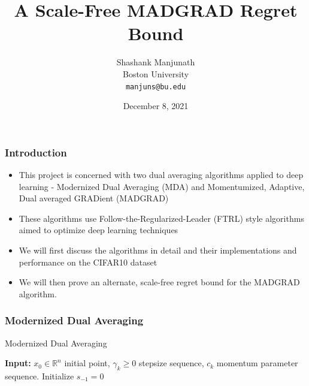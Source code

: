 \documentclass{beamer}
\title{A Scale-Free MADGRAD Regret Bound}
\author{
  Shashank Manjunath \\
  Boston University \\
  \texttt{manjuns@bu.edu} \\
}
\date{December 8, 2021}
\newcommand{\R}{\mathbb{R}}
\begin{document}
\begin{frame}
  \titlepage
\end{frame}

\begin{frame}
  \frametitle{Introduction}
  \begin{itemize}
    \item This project is concerned with two dual averaging algorithms applied to deep learning - Modernized Dual
      Averaging (MDA)\cite{jelassi_dual_2020} and Momentumized, Adaptive, Dual averaged GRADient
      (MADGRAD)\cite{defazio_adaptivity_nodate}
    \item These algorithms use Follow-the-Regularized-Leader (FTRL) style algorithms aimed to optimize deep learning
      techniques
    \item We will first discuss the algorithms in detail and their implementations and performance on the CIFAR10
      dataset\cite{krizhevsky_learning_2009}
    \item We will then prove an alternate, scale-free regret bound for the MADGRAD algorithm.
  \end{itemize}
\end{frame}

\begin{frame}
  \frametitle{Modernized Dual Averaging}

  \begin{algorithm}[H]
    \scriptsize
    \caption{Modernized Dual Averaging}\label{algo:mda}
    \textbf{Input:} $x_0 \in \R^n$ initial point, $\gamma_k \geq 0$ stepsize sequence, $c_k$ momentum parameter
    sequence. Initialize $s_{-1} = 0$ \\
  \end{algorithm}
\end{frame}
\end{document}

